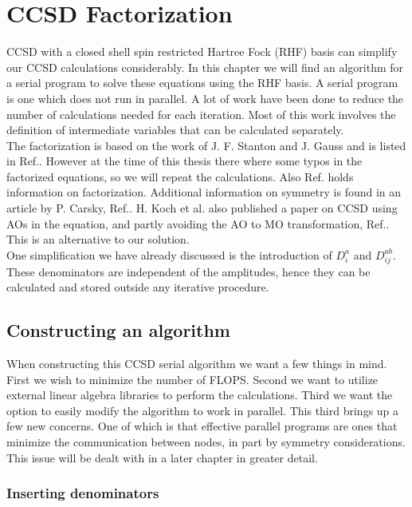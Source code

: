 

\chapter{CCSD Factorization}
CCSD with a closed shell spin restricted Hartree Fock (RHF) basis can simplify our CCSD calculations considerably. In this chapter we will find an algorithm for a serial program to solve these equations using the RHF basis. A serial program is one which does not run in parallel. A lot of work have been done to reduce the number of calculations needed for each iteration. Most of this work involves the definition of intermediate variables that can be calculated separately. \\

The factorization is based on the work of J. F. Stanton and J. Gauss and is listed in Ref.\cite{ccsd_fac1}. However at the time of this thesis there where some typos in the factorized equations, so we will repeat the calculations. Also Ref.\cite{ccsd_fac3} holds information on factorization. Additional information on symmetry is found in an article by P. Carsky, Ref.\cite{ccsd_fac2}. H. Koch et al. also published a paper on CCSD using AOs in the equation, and partly avoiding the AO to MO transformation, Ref.\cite{ccsd_fac4}. This is an alternative to our solution. \\

One simplification we have already discussed is the introduction of $D_i^a$ and $D_{ij}^{ab}$. These denominators are independent of the amplitudes, hence they can be calculated and stored outside any iterative procedure.

\newpage

\section{Constructing an algorithm}
When constructing this CCSD serial algorithm we want a few things in mind. First we wish to minimize the number of FLOPS. Second we want to utilize external linear algebra libraries to perform the calculations. Third we want the option to easily modify the algorithm to work in parallel. This third brings up a few new concerns. One of which is that effective parallel programs are ones that minimize the communication between nodes, in part by  symmetry considerations. This issue will be dealt with in a later chapter in greater detail.

\subsection{Inserting denominators}

